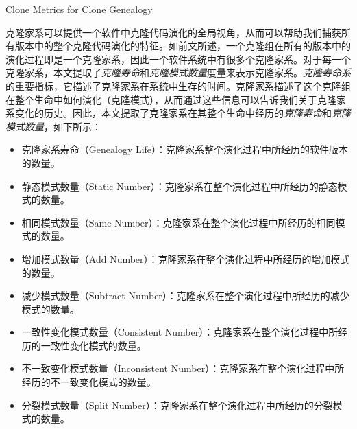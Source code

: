 {Clone Metrics for Clone Genealogy}

克隆家系可以提供一个软件中克隆代码演化的全局视角，从而可以帮助我们捕获所有版本中的整个克隆代码演化的特征。如前文所述，一个克隆组在所有的版本中的演化过程即是一个克隆家系，因此一个软件系统中有很多个克隆家系。对于每一个克隆家系，本文提取了\emph{克隆寿命}和\emph{克隆模式数量}度量来表示克隆家系。\emph{克隆寿命系}的重要指标，它描述了克隆家系在系统中生存的时间。克隆家系描述了这个克隆组在整个生命中如何演化（克隆模式），从而通过这些信息可以告诉我们关于克隆家系变化的历史。因此，本文提取了克隆家系在其整个生命中经历的\emph{克隆寿命}和\emph{克隆模式数量}，如下所示：

\begin{itemize}
\item
克隆家系寿命（Genealogy  Life）：克隆家系整个演化过程中所经历的软件版本的数量。
\item
静态模式数量（Static Number）：克隆家系在整个演化过程中所经历的静态模式的数量。
\item
相同模式数量（Same Number）：克隆家系在整个演化过程中所经历的相同模式的数量。
\item
增加模式数量（Add Number）：克隆家系在整个演化过程中所经历的增加模式的数量。
\item
减少模式数量（Subtract Number）：克隆家系在整个演化过程中所经历的减少模式的数量。
\item
一致性变化模式数量（Consistent Number）：克隆家系在整个演化过程中所经历的一致性变化模式的数量。
\item
不一致变化模式数量（Inconsistent Number）：克隆家系在整个演化过程中所经历的不一致变化模式的数量。
\item
分裂模式数量（Split Number）：克隆家系在整个演化过程中所经历的分裂模式的数量。
\end{itemize}

